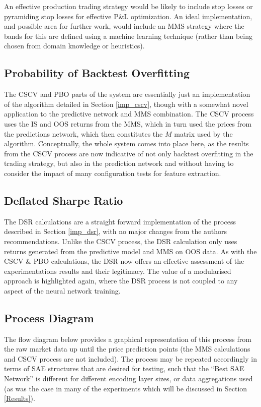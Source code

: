 \documentclass[a4paper,11pt,oneside]{article}
\theoremstyle{plain}
\theoremstyle{definition}
\begin{document}
	An effective production trading strategy would be likely to include stop losses or pyramiding stop losses for effective P\&L optimization. An ideal implementation, and possible area for further work, would include an MMS strategy where the bands for this are defined using a machine learning technique (rather than being chosen from domain knowledge or heuristics).\newline
	
	
	\subsection{Probability of Backtest Overfitting}\label{proc_cscv}
	
	The CSCV and PBO parts of the system are essentially just an implementation of the algorithm detailed in Section \ref{imp_cscv}, though with a somewhat novel application to the predictive network and MMS combination. The CSCV process uses the IS and OOS returns from the MMS, which in turn used the prices from the predictions network, which then constitutes the $M$ matrix used by the algorithm. Conceptually, the whole system comes into place here, as the results from the CSCV process are now indicative of not only backtest overfitting in the trading strategy, but also in the prediction network and without having to consider the impact of many configuration tests for feature extraction.
	
	\subsection{Deflated Sharpe Ratio}\label{proc_dsr}
	
	The DSR calculations are a straight forward implementation of the process described in Section \ref{imp_dsr}, with no major changes from the authors recommendations. Unlike the CSCV process, the DSR calculation only uses returns generated from the predictive model and MMS on OOS data. As with the CSCV \& PBO calculations, the DSR now offers an effective assessment of the experimentations results and their legitimacy. The value of a modularised approach is highlighted again, where the DSR process is not coupled to any aspect of the neural network training.
	
	\subsection{Process Diagram}\label{proc_diagram}
	
	The flow diagram below provides a graphical representation of this process from the raw market data up until the price prediction points (the MMS calculations and CSCV process are not included). The process may be repeated accordingly in terms of SAE structures that are desired for testing, such that the ``Best SAE Network'' is different for different encoding layer sizes, or data aggregations used (as was the case in many of the experiments which will be discussed in Section \ref{Results}).
	
\end{document}
